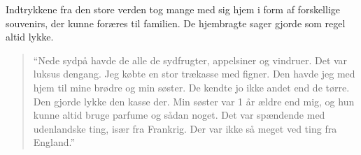 Indtrykkene fra den store verden tog mange med sig hjem i form af
forskellige souvenirs, der kunne foræres til familien. De hjembragte
sager gjorde som regel altid lykke.

\begin{quote}
``Nede sydpå havde de alle de sydfrugter, appelsiner og vindruer. Det
var luksus dengang. Jeg købte en stor trækasse med figner. Den havde jeg
med hjem til mine brødre og min søster. De kendte jo ikke andet end de
tørre. Den gjorde lykke den kasse der. Min søster var 1 år ældre end
mig, og hun kunne altid bruge parfume og sådan noget. Det var spændende
med udenlandske ting, især fra Frankrig. Der var ikke så meget ved ting
fra England.''
\end{quote}
